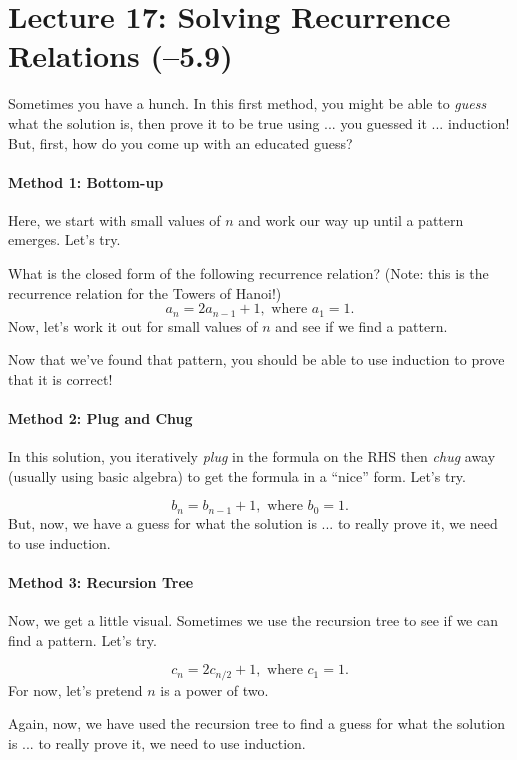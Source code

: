\section*{Lecture 17: Solving Recurrence Relations (--5.9)}

Sometimes you have a hunch.  In this first
method, you might be able to \emph{guess} what the solution is, then prove it to
be true using ... you guessed it ... induction!  But, first, how do you come up
with an educated guess?

\paragraph{Method 1: Bottom-up} Here, we start with small values of $n$ and work
our way up until a pattern emerges. Let's try.

What is the closed form of the following recurrence relation?
(Note: this is the recurrence relation for the Towers of Hanoi!)
$$
    a_n = 2 a_{n-1} + 1, \text{ where } a_1=1.
$$
Now, let's work it out for small values of $n$ and see if we find a pattern.
\practice

Now that we've found that pattern, you should be able to use induction to prove
that it is correct!

\paragraph{Method 2: Plug and Chug} In this solution, you iteratively
\emph{plug} in the formula on the RHS then \emph{chug} away (usually using basic
algebra) to get the formula in a ``nice'' form.  Let's try.

$$
    b_n = b_{n-1} + 1, \text{ where } b_0=1.
$$
\practice
But, now, we have a guess for what the solution is ... to really prove it, we
need to use induction.

\pagebreak
\paragraph{Method 3: Recursion Tree} Now, we get a little visual.  Sometimes we
use the recursion tree to see if we can find a pattern.  Let's try.

$$
    c_n = 2 c_{n/2} + 1, \text{ where } c_1=1.
$$
For now, let's pretend $n$ is a power of two.
\practice \vspace{1in}

Again, now, we have used the recursion tree to find
a guess for what the solution is ... to really prove it, we
need to use induction.

